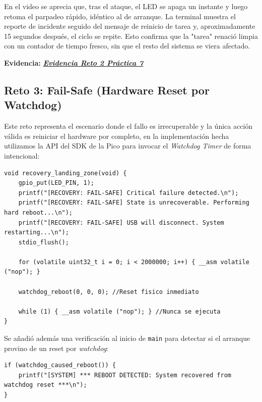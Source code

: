 \documentclass[12pt,letterpaper]{article}
\begin{document}
\bigskip

En el video se aprecia que, tras el ataque, el LED se apaga un instante y luego retoma el parpadeo rápido, idéntico al de arranque. La terminal muestra el reporte de incidente seguido del mensaje de reinicio de tarea y, aproximadamente 15 segundos después, el ciclo se repite. Esto confirma que la "tarea" renació limpia con un contador
de tiempo fresco, sin que el resto del sistema se viera afectado.

\textbf{Evidencia:}
\href{https://drive.google.com/file/d/1Hh8ghAZ_HhTtK0zuvYGGHo4ie9aAXv0f/view?usp=sharing&t=140.848}
     {\textbf{\textit{\textcolor{linkblue}{Evidencia Reto 2 Práctica 7}}}}
     
\subsection*{Reto 3: Fail-Safe (Hardware Reset por Watchdog)}
Este reto representa el escenario donde el fallo es irrecuperable y la única acción válida es reiniciar el
hardware por completo, en la implementación hecha utilizamos la API del SDK de la Pico para invocar el
\textit{Watchdog Timer} de forma intencional:
 
\begin{lstlisting}[style=modernc, caption={Fail-Safe: reinicio físico mediante watchdog}]
void recovery_landing_zone(void) {
    gpio_put(LED_PIN, 1);
    printf("[RECOVERY: FAIL-SAFE] Critical failure detected.\n");
    printf("[RECOVERY: FAIL-SAFE] State is unrecoverable. Performing hard reboot...\n");
    printf("[RECOVERY: FAIL-SAFE] USB will disconnect. System restarting...\n");
    stdio_flush();
 
    for (volatile uint32_t i = 0; i < 2000000; i++) { __asm volatile ("nop"); }
 
    watchdog_reboot(0, 0, 0); //Reset fisico inmediato
 
    while (1) { __asm volatile ("nop"); } //Nunca se ejecuta
}
\end{lstlisting}

\bigskip

Se añadió además una verificación al inicio de \texttt{main} para detectar si el arranque provino de un
reset por \textit{watchdog}:
 
\begin{lstlisting}[style=modernc, caption={Detección de reboot por watchdog al arrancar}]
if (watchdog_caused_reboot()) {
    printf("[SYSTEM] *** REBOOT DETECTED: System recovered from watchdog reset ***\n");
}
\end{lstlisting}
\end{document}
